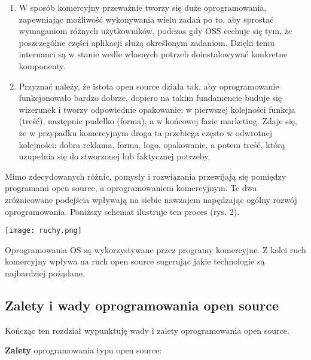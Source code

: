 \documentclass{article}
\begin{document}
\begin{enumerate}
    \item W sposób komercyjny przeważnie tworzy się duże oprogramowania, zapewniając możliwość wykonywania wielu zadań po to, aby sprostać wymaganiom różnych użytkowników, podczas gdy OSS cechuje się tym, że poszczególne części aplikacji służą określonym zadaniom. Dzięki temu internauci są w stanie wedle własnych potrzeb doinstalowywać konkretne komponenty\cite{Kotula}.
    
    \item Przyznać należy, że istota open source działa tak, aby oprogramowanie funkcjonowało bardzo dobrze, dopiero na takim fundamencie buduje się wizerunek i tworzy odpowiednie opakowanie: w pierwszej kolejności funkcja (treść), następnie pudełko (forma), a w końcowej fazie marketing. Zdaje się, że w przypadku komercyjnym droga ta przebiega często w odwrotnej kolejności: dobra reklama, forma, logo, opakowanie, a potem treść, którą uzupełnia się do stworzonej lub faktycznej potrzeby\cite{Kotula}.
    \end{enumerate}
    
    Mimo zdecydowanych różnic, pomysły i rozwiązania przewijają się pomiędzy programami open source, a oprogramowaniem komercyjnym. Te dwa zróżnicowane podejścia wpływają na siebie nawzajem napędzając ogólny rozwój oprogramowania. Poniższy schemat ilustruje ten proces (rys. 2).
    \begin{center}
        \texttt{[image: ruchy.png]}
    \end{center}
    \hspace{4mm} Oprogramowania OS są wykorzystywane przez programy komercyjne. Z kolei ruch komercyjny wpływa na ruch open source sugerując jakie technologie są najbardziej pożądane.

\subsection{Zalety i wady oprogramowania open source}

\hspace{4mm} Kończąc ten rozdział wypunktuję wady i zalety oprogramowania open source. \newline

\textbf{Zalety} oprogramowania typu open source:
\end{document}
